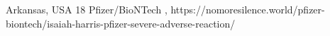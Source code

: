           {Arkansas, USA}
          {18}
          {Pfizer/BioNTech}
          {}
          {
            ,
          }
          {https://nomoresilence.world/pfizer-biontech/isaiah-harris-pfizer-severe-adverse-reaction/}

